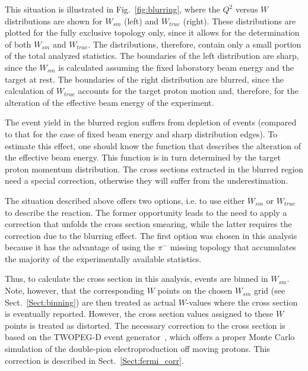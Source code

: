 This situation is illustrated in Fig.~\ref{fig:blurring}, where the $Q^2$ versus $W$ distributions are shown for $W_{sm}$ (left) and $W_{true}$ (right). These distributions are plotted for the fully exclusive topology only, since it allows for the determination of both $W_{sm}$ and $W_{true}$. The distributions, therefore, contain only a small portion of the total analyzed statistics. The boundaries of the left distribution are sharp, since the $W_{sm}$ is calculated assuming the fixed laboratory beam energy and the target at rest. The boundaries of the right distribution are blurred, since the calculation of $W_{true}$ accounts for the target proton motion and, therefore, for the alteration of the effective beam energy of the experiment.


The event yield in the blurred region suffers from depletion of events (compared to that for the case of fixed beam energy and sharp distribution edges). To estimate this effect, one should know the function that describes the alteration of the effective beam energy. This function is in turn determined by the target proton momentum distribution. The cross sections extracted in the blurred region need a special correction, otherwise they will suffer from the underestimation.



The situation described above offers two options, i.e. to use either $W_{sm}$ or $W_{true}$ to describe the reaction. The former opportunity leads to the need to apply a correction that unfolds the cross section smearing, while the latter requires the correction due to the blurring effect. The first option was chosen in this analysis because it has the advantage of using the $\pi^{-}$ missing topology that accumulates the majority of the experimentally available statistics. 

Thus, to calculate the cross section in this analysis, events are binned in $W_{sm}$. Note, however, that the corresponding $W$ points on the chosen $W_{sm}$ grid (see Sect.~\ref{Sect:binning}) are then treated as actual $W$-values where the cross section is eventually reported. However, the cross section values assigned to these $W$ points is treated as distorted. The necessary correction to the cross section is based on the TWOPEG-D event generator~\cite{twopeg-d}, which offers a proper Monte Carlo simulation of the double-pion electroproduction off moving protons. This correction is described in Sect.~\ref{Sect:fermi_corr}.





